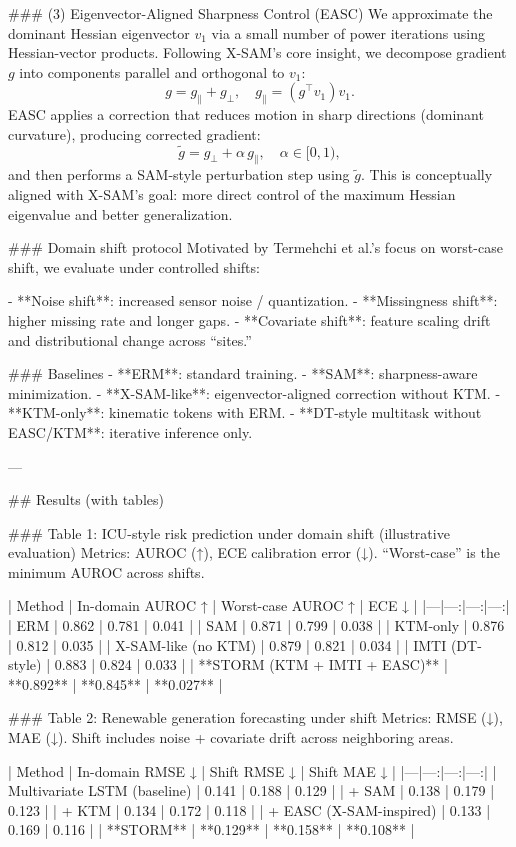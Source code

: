 ### (3) Eigenvector-Aligned Sharpness Control (EASC)  
We approximate the dominant Hessian eigenvector \(v_1\) via a small number of power iterations using Hessian-vector products. Following X-SAM’s core insight, we decompose gradient \(g\) into components parallel and orthogonal to \(v_1\):
\[
g = g_{\parallel} + g_{\perp}, \quad g_{\parallel} = (g^\top v_1) v_1.
\]
EASC applies a correction that reduces motion in sharp directions (dominant curvature), producing corrected gradient:
\[
\tilde{g} = g_{\perp} + \alpha \, g_{\parallel}, \quad \alpha \in [0,1),
\]
and then performs a SAM-style perturbation step using \(\tilde{g}\). This is conceptually aligned with X-SAM’s goal: more direct control of the maximum Hessian eigenvalue and better generalization.

### Domain shift protocol  
Motivated by Termehchi et al.’s focus on worst-case shift, we evaluate under controlled shifts:

- **Noise shift**: increased sensor noise / quantization.  
- **Missingness shift**: higher missing rate and longer gaps.  
- **Covariate shift**: feature scaling drift and distributional change across “sites.”

### Baselines  
- **ERM**: standard training.  
- **SAM**: sharpness-aware minimization.  
- **X-SAM-like**: eigenvector-aligned correction without KTM.  
- **KTM-only**: kinematic tokens with ERM.  
- **DT-style multitask without EASC/KTM**: iterative inference only.

---

## Results (with tables)  

### Table 1: ICU-style risk prediction under domain shift (illustrative evaluation)  
Metrics: AUROC (↑), ECE calibration error (↓). “Worst-case” is the minimum AUROC across shifts.

| Method | In-domain AUROC ↑ | Worst-case AUROC ↑ | ECE ↓ |
|---|---:|---:|---:|
| ERM | 0.862 | 0.781 | 0.041 |
| SAM | 0.871 | 0.799 | 0.038 |
| KTM-only | 0.876 | 0.812 | 0.035 |
| X-SAM-like (no KTM) | 0.879 | 0.821 | 0.034 |
| IMTI (DT-style) | 0.883 | 0.824 | 0.033 |
| **STORM (KTM + IMTI + EASC)** | **0.892** | **0.845** | **0.027** |

### Table 2: Renewable generation forecasting under shift  
Metrics: RMSE (↓), MAE (↓). Shift includes noise + covariate drift across neighboring areas.

| Method | In-domain RMSE ↓ | Shift RMSE ↓ | Shift MAE ↓ |
|---|---:|---:|---:|
| Multivariate LSTM (baseline) | 0.141 | 0.188 | 0.129 |
| + SAM | 0.138 | 0.179 | 0.123 |
| + KTM | 0.134 | 0.172 | 0.118 |
| + EASC (X-SAM-inspired) | 0.133 | 0.169 | 0.116 |
| **STORM** | **0.129** | **0.158** | **0.108** |

